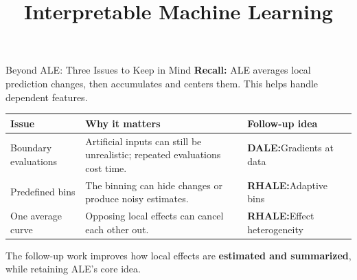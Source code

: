\documentclass[10pt,compress,t,notes=noshow,xcolor=table]{beamer}
\title{Interpretable Machine Learning}
\begin{document}


\begin{framev}[align=top]{Beyond ALE: Three Issues to Keep in Mind}
\textbf{Recall:} ALE averages local prediction changes, then accumulates and centers them.
This helps handle dependent features. 
\par
\spacer[0.5]
\begin{center}
\renewcommand{\arraystretch}{1.5}
\begin{tabular}{@{}>{\raggedright\arraybackslash}p{} >{\raggedright\arraybackslash}p{} >{\raggedright\arraybackslash}p{}@{}}
\toprule
\textbf{Issue} & \textbf{Why it matters} & \textbf{Follow-up idea} \\
\midrule
Boundary evaluations & Artificial inputs can still be unrealistic; repeated evaluations cost time. & \textcolor{aleBlue}{\textbf{DALE:}\newline Gradients at data} \\
Predefined bins & The binning can hide changes or produce noisy estimates. & \textcolor{aleTeal}{\textbf{RHALE:}\newline Adaptive bins} \\
One average curve & Opposing local effects can cancel each other out. & \textcolor{aleTeal}{\textbf{RHALE:}\newline Effect heterogeneity} \\
\bottomrule
\end{tabular}
\end{center}
\spacer[0.5]
The follow-up work improves how local effects are \textbf{estimated and summarized}, while retaining ALE's core idea.
\end{framev}
\end{document}
